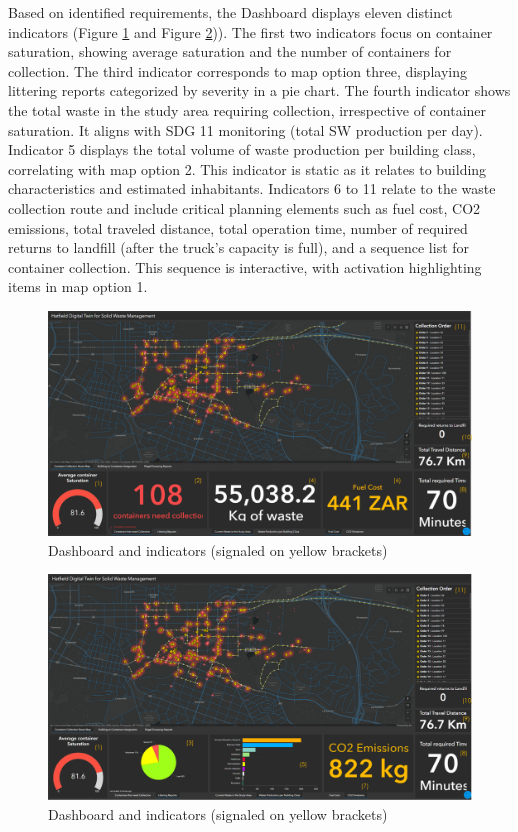 \documentclass[authoryear,preprint,review,11pt,doubleblind]{elsarticle}
\begin{document}
    Based on identified requirements, the Dashboard displays eleven distinct indicators (Figure \ref{fig:indicators1} and Figure \ref{fig:indicators2})). The first two indicators focus on container saturation, showing average saturation and the number of containers for collection. The third indicator corresponds to map option three, displaying littering reports categorized by severity in a pie chart. The fourth indicator shows the total waste in the study area requiring collection, irrespective of container saturation. It aligns with SDG 11 monitoring (total SW production per day). Indicator 5 displays the total volume of waste production per building class, correlating with map option 2. This indicator is static as it relates to building characteristics and estimated inhabitants. Indicators 6 to 11 relate to the waste collection route and include critical planning elements such as fuel cost, CO2 emissions, total traveled distance, total operation time, number of required returns to landfill (after the truck's capacity is full), and a sequence list for container collection. This sequence is interactive, with activation highlighting items in map option 1.

    \begin{figure}[h!]
    \centering
        \includegraphics[width=0.9\linewidth]{Figures/indicators1.png}
        \caption{Dashboard and indicators (signaled on yellow brackets)}
        \label{fig:indicators1}
    \end{figure}

    \begin{figure}[h!]
    \centering
        \includegraphics[width=0.9\linewidth]{Figures/indicators2.png}
        \caption{Dashboard and indicators (signaled on yellow brackets)}
        \label{fig:indicators2}
    \end{figure}
\end{document}
